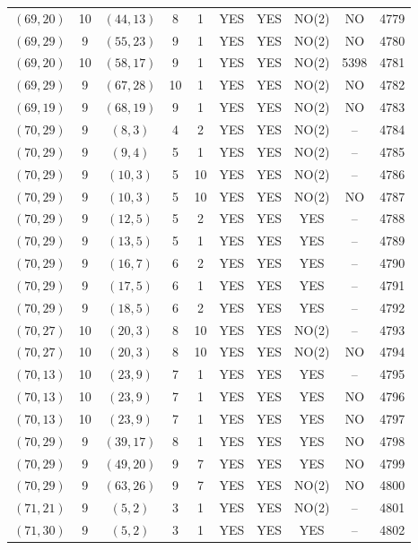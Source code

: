 \begin{longtable}{|c|c|c|c|c|c|c|c|c|c|}
$(69, 20)$ & 10 & $(44, 13)$ & 8 & 1 & YES & YES & NO(2) & NO & 4779\\
$(69, 29)$ & 9 & $(55, 23)$ & 9 & 1 & YES & YES & NO(2) & NO & 4780\\
$(69, 20)$ & 10 & $(58, 17)$ & 9 & 1 & YES & YES & NO(2) & 5398 & 4781\\
$(69, 29)$ & 9 & $(67, 28)$ & 10 & 1 & YES & YES & NO(2) & NO & 4782\\
$(69, 19)$ & 9 & $(68, 19)$ & 9 & 1 & YES & YES & NO(2) & NO & 4783\\
$(70, 29)$ & 9 & $(8, 3)$ & 4 & 2 & YES & YES & NO(2) & -- & 4784\\
$(70, 29)$ & 9 & $(9, 4)$ & 5 & 1 & YES & YES & NO(2) & -- & 4785\\
$(70, 29)$ & 9 & $(10, 3)$ & 5 & 10 & YES & YES & NO(2) & -- & 4786\\
$(70, 29)$ & 9 & $(10, 3)$ & 5 & 10 & YES & YES & NO(2) & NO & 4787\\
$(70, 29)$ & 9 & $(12, 5)$ & 5 & 2 & YES & YES & YES & -- & 4788\\
$(70, 29)$ & 9 & $(13, 5)$ & 5 & 1 & YES & YES & YES & -- & 4789\\
$(70, 29)$ & 9 & $(16, 7)$ & 6 & 2 & YES & YES & YES & -- & 4790\\
$(70, 29)$ & 9 & $(17, 5)$ & 6 & 1 & YES & YES & YES & -- & 4791\\
$(70, 29)$ & 9 & $(18, 5)$ & 6 & 2 & YES & YES & YES & -- & 4792\\
$(70, 27)$ & 10 & $(20, 3)$ & 8 & 10 & YES & YES & NO(2) & -- & 4793\\
$(70, 27)$ & 10 & $(20, 3)$ & 8 & 10 & YES & YES & NO(2) & NO & 4794\\
$(70, 13)$ & 10 & $(23, 9)$ & 7 & 1 & YES & YES & YES & -- & 4795\\
$(70, 13)$ & 10 & $(23, 9)$ & 7 & 1 & YES & YES & YES & NO & 4796\\
$(70, 13)$ & 10 & $(23, 9)$ & 7 & 1 & YES & YES & YES & NO & 4797\\
$(70, 29)$ & 9 & $(39, 17)$ & 8 & 1 & YES & YES & YES & NO & 4798\\
$(70, 29)$ & 9 & $(49, 20)$ & 9 & 7 & YES & YES & YES & NO & 4799\\
$(70, 29)$ & 9 & $(63, 26)$ & 9 & 7 & YES & YES & NO(2) & NO & 4800\\
$(71, 21)$ & 9 & $(5, 2)$ & 3 & 1 & YES & YES & NO(2) & -- & 4801\\
$(71, 30)$ & 9 & $(5, 2)$ & 3 & 1 & YES & YES & YES & -- & 4802\\

\end{longtable}
